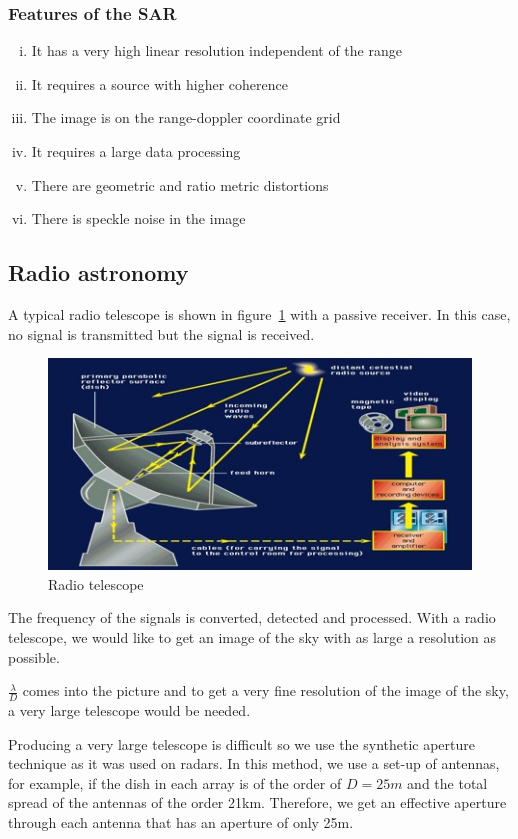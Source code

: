 \subsubsection*{Features of the SAR}
\begin{enumerate}[(i)]
\item It has a very high linear resolution independent of the range
\item It requires a source with higher coherence
\item The image is on the range-doppler coordinate grid
\item It requires a large data processing
\item There are geometric and ratio metric distortions
\item There is speckle noise in the image
\end{enumerate}

\subsection{Radio astronomy} 

A typical radio telescope is shown in figure~\ref{fig:radiotelescope0} with a passive receiver. In this case, no signal is transmitted but the signal is received.
\begin{figure}[h]
\centering
\includegraphics[scale=0.5]{./graphics/Radio-Telescope-0}
\caption{Radio telescope}
\label{fig:radiotelescope0}
\end{figure}

The frequency of the signals is converted, detected and processed. With a radio telescope, we would like to get an image of the sky with as large a resolution as possible.

$\frac{\lambda}{D}$ comes into the picture and to get a very fine resolution of the image of the sky, a very large telescope would be needed.


Producing a very large telescope is difficult so we use the synthetic aperture technique as it was used on radars. In this method, we use a set-up of antennas, for example, if the dish in each array is of the order of $ D = 25m $ and the total spread of the antennas of the order 21km. Therefore, we get an effective aperture through each antenna that has an aperture of only 25m.


